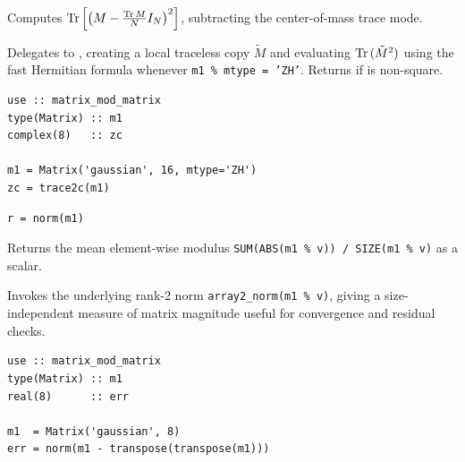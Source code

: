 Computes ${\rm Tr\,}\!\left[\left(M - \frac{{\rm Tr\,} M}{N} I_N\right)^2\right]$, subtracting the center-of-mass trace mode.

Delegates to , creating a local traceless copy $\tilde{M}$ and evaluating ${\rm Tr\,}(\tilde{M}^2)$ using the fast Hermitian formula whenever \texttt{m1 \% mtype = 'ZH'}. Returns  if  is non-square.

\begin{description}[leftmargin=2.2cm, style=nextline]
\end{description}

\lstset{language=[95]Fortran}
\begin{lstlisting}
use :: matrix_mod_matrix
type(Matrix) :: m1
complex(8)   :: zc

m1 = Matrix('gaussian', 16, mtype='ZH')
zc = trace2c(m1)
\end{lstlisting}


\lstset{language=[95]Fortran}
\begin{lstlisting}
r = norm(m1)
\end{lstlisting}

Returns the mean element-wise modulus \texttt{SUM(ABS(m1 \% v)) / SIZE(m1 \% v)} as a  scalar.

Invokes the underlying rank-2 norm \texttt{array2\_norm(m1 \% v)}, giving a size-independent measure of matrix magnitude useful for convergence and residual checks.

\begin{description}[leftmargin=2.2cm, style=nextline]
\end{description}

\lstset{language=[95]Fortran}
\begin{lstlisting}
use :: matrix_mod_matrix
type(Matrix) :: m1
real(8)      :: err

m1  = Matrix('gaussian', 8)
err = norm(m1 - transpose(transpose(m1)))
\end{lstlisting}


